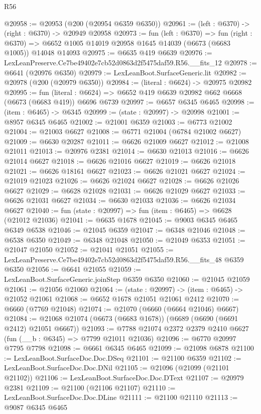 \begin{lexlean}{R56}
\begin{coremodule}
@20958 := @20953 (@200 (@20954 @6359 @6350))
@20961 := (left : @6370) -> (right : @6370) -> @20949 @20958
@20973 := fun (left : @6370) =>
  fun (right : @6370) => @6652 @1005 @14019 @20958 @1645 @14039 (@6673 (@6683 @1005)) @14048 @14093
@20975 := @6635 @419 @6639
@20976 := LexLeanPreserve.Ce7be49402e7cb52d0863d2f5475daf59.R56.__fits_12
@20978 := @6641 (@20976 @6350)
@20979 := LexLeanBoot.SurfaceGeneric.lit
@20982 := @20978 (@200 (@20979 @6350))
@20984 := (literal : @6624) -> @20975 @20982
@20995 := fun (literal : @6624) =>
  @6652 @419 @6639 @20982 @662 @6668 (@6673 (@6683 @419)) @6696 @6739
@20997 := @6657 @6345 @6465
@20998 := (item : @6465) -> @6345
@20999 := (state : @20997) -> @20998
@21001 := @8957 @6345 @6465
@21002 := @21001 @6359
@21003 := @6773 @21002
@21004 := @21003 @6627
@21008 := @6771 @21004 (@6784 @21002 @6627)
@21009 := @6630 @20287
@21011 := @6626 @21009 @6627
@21012 := @21008 @21011
@21013 := @20976 @2381
@21014 := @6630 @21013
@21016 := @6626 @21014 @6627
@21018 := @6626 @21016 @6627
@21019 := @6626 @21018
@21021 := @6626 @18161 @6627
@21023 := @6626 @21021 @6627
@21024 := @21019 @21023
@21026 := @6626 @21024 @6627
@21028 := @6626 @21026 @6627
@21029 := @6628 @21028
@21031 := @6626 @21029 @6627
@21033 := @6626 @21031 @6627
@21034 := @6630 @21033
@21036 := @6626 @21034 @6627
@21040 := fun (state : @20997) => fun (item : @6465) => @6628 (@21012 @21036)
@21041 := @6635 @1678
@21045 := @9003 @6345 @6465 @6349 @6538
@21046 := @21045 @6359
@21047 := @6348 @21046
@21048 := @6538 @6350
@21049 := @6348 @21048
@21050 := @21049 @6353
@21051 := @21047 @21050
@21052 := @21041 @21051
@21055 := LexLeanPreserve.Ce7be49402e7cb52d0863d2f5475daf59.R56.__fits_48 @6359 @6350
@21056 := @6641 @21055
@21059 := LexLeanBoot.SurfaceGeneric.joinStep @6359 @6350
@21060 := @21045 @21059
@21061 := @21056 @21060
@21064 := (state : @20997) -> (item : @6465) -> @21052 @21061
@21068 := @6652 @1678 @21051 @21061 @2412
@21070 := @6660 (@7769 @21048)
@21074 := @21070 (@6660 (@6664 @21046) @6667)
@21084 := @21068 @21074 (@6673 (@6683 @1678)) (@6689 (@6690 (@6691 @2412) @21051 @6667))
@21093 := @7788 @21074 @2372 @2379 @2410 @6627 (fun (__b : @6345) => @7799 @21011 @21036)
@21096 := @6770 @20997 @7795 @7798
@21098 := @6661 @6345 @6465
@21099 := @21098 @6878
@21100 := LexLeanBoot.SurfaceDoc.Doc.DSeq
@21101 := @21100 @6359
@21102 := LexLeanBoot.SurfaceDoc.Doc.DNil
@21105 := @21096 (@21099 (@21101 @21102))
@21106 := LexLeanBoot.SurfaceDoc.Doc.DText
@21107 := @20979 @2381
@21109 := @21100 (@21106 @21107)
@21110 := LexLeanBoot.SurfaceDoc.Doc.DLine
@21111 := @21100 @21110
@21113 := @9087 @6345 @6465

\end{coremodule}
\end{lexlean}
